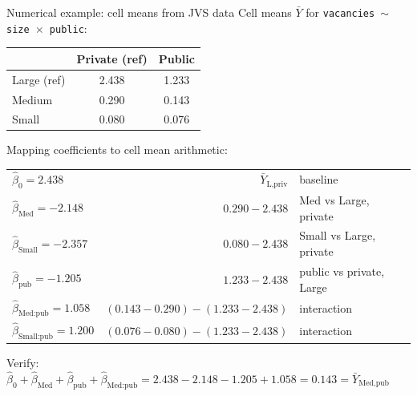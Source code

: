 \documentclass[10pt,ignorenonframetext,aspectratio=169]{beamer}
\begin{document}
\begin{frame}{Numerical example: cell means from JVS data}
    Cell means $\bar{Y}$ for \texttt{vacancies $\sim$ size $\times$ public}:

    \begin{table}[h]\centering
    \begin{tabular}{l|cc}
    & Private (ref) & Public \\
    \hline
    Large (ref) & 2.438 & 1.233 \\
    Medium & 0.290 & 0.143 \\
    Small & 0.080 & 0.076 \\
    \end{tabular}
    \end{table}

    Mapping coefficients to cell mean arithmetic:
    \begin{table}[h]\centering\small
    \begin{tabular}{lrl}
    \hline
    $\hat{\beta}_0 = 2.438$ & $\bar{Y}_{\text{L,priv}}$ & baseline \\
    $\hat{\beta}_{\text{Med}} = -2.148$ & $0.290 - 2.438$ & Med vs Large, private \\
    $\hat{\beta}_{\text{Small}} = -2.357$ & $0.080 - 2.438$ & Small vs Large, private \\
    $\hat{\beta}_{\text{pub}} = -1.205$ & $1.233 - 2.438$ & public vs private, Large \\
    $\hat{\beta}_{\text{Med:pub}} = 1.058$ & $(0.143-0.290)-(1.233-2.438)$ & interaction \\
    $\hat{\beta}_{\text{Small:pub}} = 1.200$ & $(0.076-0.080)-(1.233-2.438)$ & interaction \\
    \hline
    \end{tabular}
    \end{table}

    Verify: $\hat{\beta}_0 + \hat{\beta}_{\text{Med}} + \hat{\beta}_{\text{pub}} + \hat{\beta}_{\text{Med:pub}} = 2.438 - 2.148 - 1.205 + 1.058 = 0.143 = \bar{Y}_{\text{Med,pub}}$ \checkmark
\end{frame}
\end{document}
